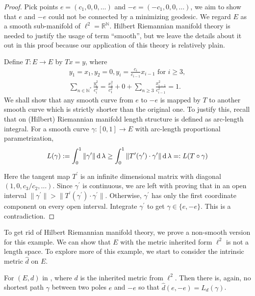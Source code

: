 \begin{proof}
	Pick points $e=(c_1, 0,0,\ldots)$ and $-e=(-c_1, 0,0,\ldots)$,
	we aim to show that $e$ and $-e$ could not be connected by a minimizing geodesic.
	We regard $E$ as a smooth sub-manifold of $\ell^2 = \mathbb{R}^\mathbb{N}$.
	Hilbert Riemannian manifold theory is needed to justify the usage of term ``smooth'',
	but we leave the details about it out in this proof because
	our application of this theory is relatively plain.

	Define \( T: E \rightarrow E \) by \( T x = y \), where
	\begin{gather*}
		y _ { 1 } = x _ { 1 } , y _ { 2 } = 0 , y _ { i } = \frac{c_i}{c_{i-1}} x_{i-1} \text { for } i \geq 3, \\
		\sum_{n \in \mathbb{N}^*} \frac{y_i^2}{c_i^2} = \frac{x_1^2}{c_1^2} + 0 + \sum_{n \geq 3} \frac{x_{i-1}^2}{c_{i-1}^2}=1.
	\end{gather*}
	We shall show that any smooth curve from \( e\) to \( -e \) is mapped by \( T \)
	to another smooth curve which is strictly shorter than the original one.
	To justify this, recall that on (Hilbert) Riemannian manifold length structure is defined as arc-length integral.
	For a smooth curve $\gamma: [0,1] \rightarrow E$ with arc-length proportional parametrization,
	\[
		L(\gamma) := \int_{0}^{1} \| \gamma^\prime \| \operatorname{d} \lambda \geq
		\int_{0}^{1} \| T^\prime(\gamma^\prime) \cdot \gamma^\prime \| \operatorname{d} \lambda =: L(T \circ \gamma)
	\]

	Here the tangent map $T^\prime$ is an infinite dimensional matrix with
	diagonal $(1,0,{c_3}/{c_2}, \ldots)$.
	Since $\gamma^\prime$ is continuous,
	we are left with proving that in an open interval $\| \gamma^\prime \| > \| T^\prime(\gamma^\prime) \cdot \gamma^\prime \|$.
	Otherwise, $\gamma^\prime$ has only the first coordinate component on every open interval.
	Integrate $\gamma^\prime$ to get $\gamma \in \{ e, -e\}$.
	This is a contradiction.
\end{proof}

To get rid of Hilbert Riemannian manifold theory,
we prove a non-smooth version for this example.
We can show that $E$ with the metric inherited form $\ell^2$ is not a length space.
To explore more of this example,
we start to consider the intrinsic metric $\hat{d}$ on $E$.

\begin{lem}
	\label{lem:ellipsoid_example_non_smooth}
	For $(E, d)$ in , where $d$ is the inherited metric from $\ell^2$.
	Then there is, again, no shortest path $\gamma$ between two poles $e$ and $-e$
	so that $\hat{d}(e, -e) = L_d (\gamma)$.
\end{lem}

